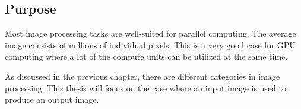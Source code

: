 \subsection{Purpose}

Most image processing tasks are well-suited for parallel computing. The average image consists of millions of individual pixels. This is a very good case for GPU computing where a lot of the compute units can be utilized at the same time. 
\newline

As discussed in the previous chapter, there are different categories in image processing. This thesis will focus on the case where an input image is used to produce an output image. 

